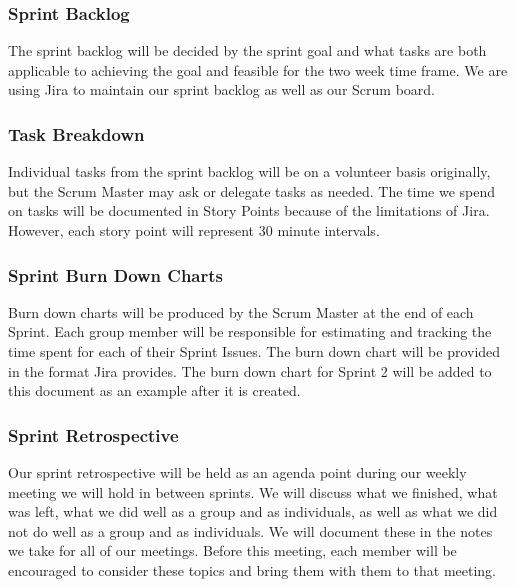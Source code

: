 \subsubsection{Sprint Backlog}
The sprint backlog will be decided by the sprint goal and what tasks are both applicable to achieving the goal and feasible for the two week time frame. We are using Jira to maintain our sprint backlog as well as our Scrum board.

\subsubsection{Task Breakdown}
Individual tasks from the sprint backlog will be on a volunteer basis originally, but the Scrum Master may ask or delegate tasks as needed. The time we spend on tasks will be documented in Story Points because of the limitations of Jira. However, each story point will represent 30 minute intervals.

\subsubsection{Sprint Burn Down Charts}
Burn down charts will be produced by the Scrum Master at the end of each Sprint. Each group member will be responsible for estimating and tracking the time spent for each of their Sprint Issues. The burn down chart will be provided in the format Jira provides. The burn down chart for Sprint 2 will be added to this document as an example after it is created.


\subsubsection{Sprint Retrospective}
Our sprint retrospective will be held as an agenda point during our weekly meeting we will hold in between sprints. We will discuss what we finished, what was left, what we did well as a group and as individuals, as well as what we did not do well as a group and as individuals. We will document these in the notes we take for all of our meetings. Before this meeting, each member will be encouraged to consider these topics and bring them with them to that meeting. 
